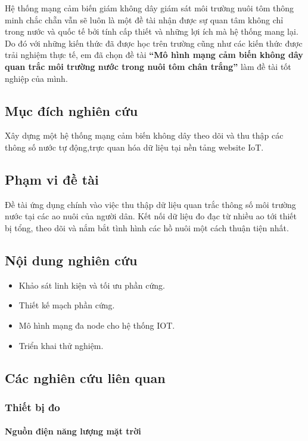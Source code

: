 \documentclass{article} %
\begin{document}
	Hệ thống mạng cảm biến giám không dây giám sát môi trường nuôi tôm thông minh chắc chẵn vẫn sẽ luôn là một đề tài nhận được sự quan tâm không chỉ trong nước và quốc tế bởi tính cấp thiết và những lợi ích mà hệ thống mang lại. Do đó với những kiến thức đã được học trên trường cũng như các kiến thức được trải nghiệm thực tế, em đã chọn đề tài \textbf{ “Mô hình mạng cảm biến không dây quan trắc môi trường nước trong nuôi tôm chân trắng” }làm đề tài tốt nghiệp của mình.
	
	\subsection{Mục đích nghiên cứu}
	Xây dựng một hệ thống mạng cảm biến không dây theo dõi và thu thập các thông số nước tự động,trực quan hóa dữ liệu tại nền tảng website IoT.
	\subsection{Phạm vi đề tài}
	Đề tài ứng dụng chính vào việc thu thập dữ liệu quan trắc thông số môi trường nước tại các ao nuôi của người dân. Kết nối dữ liệu đo đạc từ nhiều ao tới thiết bị tổng, theo dõi và nắm bắt tình hình các hồ nuôi một cách thuận tiện nhất.
	
	\subsection{Nội dung nghiên cứu}
	\begin{itemize}
		\item Khảo sát linh kiện và tối ưu phần cứng.
		\item Thiết kế mạch phần cứng.
		\item Mô hình mạng đa node cho hệ thống IOT.
		\item Triển khai thử nghiệm.
	\end{itemize}
	
	\subsection{Các nghiên cứu liên quan}
	
	\subsubsection{Thiết bị đo}
	
	\paragraph{Nguồn điện năng lượng mặt trời}\mbox{}
	
\end{document}
